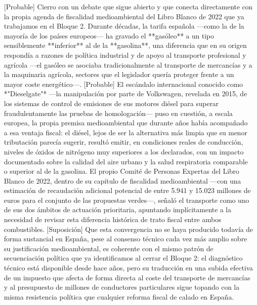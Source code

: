 \documentclass[10pt,a4paper]{article}
\begin{document}
[Probable] Cierro con un debate que sigue abierto y que conecta directamente con la propia agenda de fiscalidad medioambiental del Libro Blanco de 2022 que ya trabajamos en el Bloque 2. Durante décadas, la tarifa española —como la de la mayoría de los países europeos— ha gravado el **gasóleo** a un tipo sensiblemente **inferior** al de la **gasolina**, una diferencia que en su origen respondía a razones de política industrial y de apoyo al transporte profesional y agrícola —el gasóleo se asociaba tradicionalmente al transporte de mercancías y a la maquinaria agrícola, sectores que el legislador quería proteger frente a un mayor coste energético—. [Probable] El escándalo internacional conocido como *"Dieselgate"* —la manipulación por parte de Volkswagen, revelada en 2015, de los sistemas de control de emisiones de sus motores diésel para superar fraudulentamente las pruebas de homologación— puso en cuestión, a escala europea, la propia premisa medioambiental que durante años había acompañado a esa ventaja fiscal: el diésel, lejos de ser la alternativa más limpia que su menor tributación parecía sugerir, resultó emitir, en condiciones reales de conducción, niveles de óxidos de nitrógeno muy superiores a los declarados, con un impacto documentado sobre la calidad del aire urbano y la salud respiratoria comparable o superior al de la gasolina. El propio Comité de Personas Expertas del Libro Blanco de 2022, dentro de su capítulo de fiscalidad medioambiental —con una estimación de recaudación adicional potencial de entre 5.941 y 15.023 millones de euros para el conjunto de las propuestas verdes—, señaló el transporte como uno de sus dos ámbitos de actuación prioritaria, apuntando implícitamente a la necesidad de revisar esta diferencia histórica de trato fiscal entre ambos combustibles. [Suposición] Que esta convergencia no se haya producido todavía de forma sustancial en España, pese al consenso técnico cada vez más amplio sobre su justificación medioambiental, es coherente con el mismo patrón de secuenciación política que ya identificamos al cerrar el Bloque 2: el diagnóstico técnico está disponible desde hace años, pero su traducción en una subida efectiva de un impuesto que afecta de forma directa al coste del transporte de mercancías y al presupuesto de millones de conductores particulares sigue topando con la misma resistencia política que cualquier reforma fiscal de calado en España.
\end{document}
